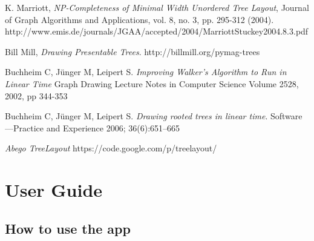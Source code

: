 \documentclass{report}
\begin{document}
\begin{thebibliography}{9}
  K. Marriott, 
  \emph{NP-Completeness of Minimal Width Unordered Tree Layout}, 
  Journal of Graph Algorithms and Applications, 
  vol. 8, no. 3, pp. 295-312 (2004).
  http://www.emis.de/journals/JGAA/accepted/2004/MarriottStuckey2004.8.3.pdf

  Bill Mill,
  \emph{Drawing Presentable Trees}.
  http://billmill.org/pymag-trees

  Buchheim C, J\"unger M, Leipert S. 
  \emph{Improving Walker's Algorithm to Run in Linear Time}
  Graph Drawing Lecture Notes in Computer Science Volume 2528, 
  2002, pp 344-353

  Buchheim C, J\"unger M, Leipert S. 
  \emph{Drawing rooted trees in linear time}. 
  Software—Practice and Experience 2006; 36(6):651–665

  \emph{Abego TreeLayout}
  https://code.google.com/p/treelayout/

\end{thebibliography}

\chapter{User Guide}
\section{How to use the app}
\end{document}
